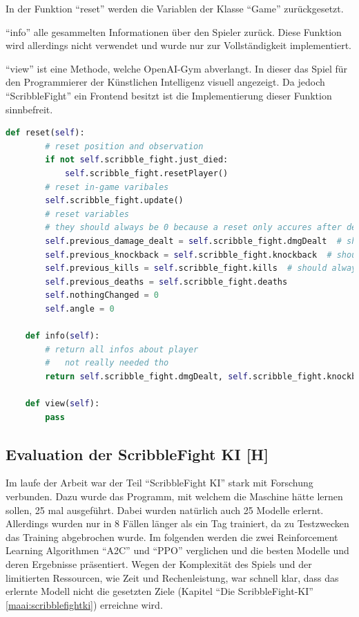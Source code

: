 In der Funktion ``reset'' werden die Variablen der Klasse ``Game'' zurückgesetzt.

``info'' alle gesammelten Informationen über den Spieler zurück. Diese Funktion wird allerdings nicht verwendet und wurde nur zur Vollständigkeit implementiert.

``view'' ist eine Methode, welche OpenAI-Gym abverlangt. In dieser das Spiel für den Programmierer der Künstlichen Intelligenz visuell angezeigt. Da jedoch ``ScribbleFight'' ein Frontend besitzt ist die Implementierung dieser Funktion sinnbefreit.


\begin{lstlisting}[language=Python,firstnumber=182]
    def reset(self):
        # reset position and observation
        if not self.scribble_fight.just_died:
            self.scribble_fight.resetPlayer()
        # reset in-game varibales
        self.scribble_fight.update()
        # reset variables
        # they should always be 0 because a reset only accures after death or as initialisation
        self.previous_damage_dealt = self.scribble_fight.dmgDealt  # should always be 0
        self.previous_knockback = self.scribble_fight.knockback  # should always be 1
        self.previous_kills = self.scribble_fight.kills  # should always be 0
        self.previous_deaths = self.scribble_fight.deaths
        self.nothingChanged = 0
        self.angle = 0

    def info(self):
        # return all infos about player
        #   not really needed tho
        return self.scribble_fight.dmgDealt, self.scribble_fight.knockback, self.scribble_fight.kills, self.scribble_fight.deaths

    def view(self):
        pass

\end{lstlisting}

\subsection{Evaluation der ScribbleFight KI [H]}

Im laufe der Arbeit war der Teil ``ScribbleFight KI'' stark mit Forschung verbunden. Dazu wurde das Programm,
mit welchem die Maschine hätte lernen sollen, 25 mal ausgeführt. Dabei wurden natürlich auch 25 Modelle erlernt.
Allerdings wurden nur in 8 Fällen länger als ein Tag trainiert, da zu Testzwecken das Training abgebrochen wurde.
Im folgenden werden die zwei Reinforcement Learning Algorithmen ``A2C'' und ``PPO'' verglichen und die besten Modelle
und deren Ergebnisse präsentiert. Wegen der Komplexität des Spiels und der limitierten Ressourcen, wie Zeit und Rechenleistung,
war schnell klar, dass das erlernte Modell nicht die gesetzten Ziele (Kapitel ``Die ScribbleFight-KI'' \ref{maai:scribblefightki}) erreichne wird.

